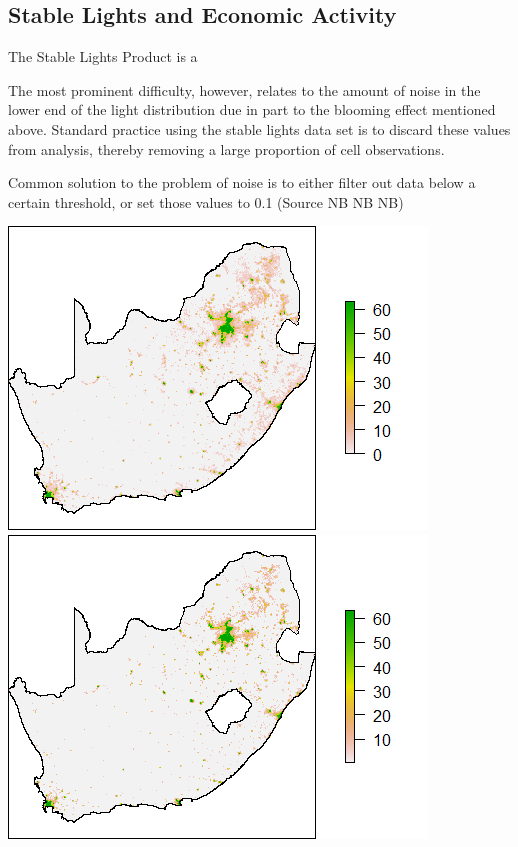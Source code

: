\documentclass[11pt,preprint, authoryear]{elsarticle}
\let\origfigure\figure
\let\endorigfigure\endfigure
\renewenvironment{figure}[1][2] {
    \expandafter\origfigure\expandafter[H]
} {
    \endorigfigure
}
\numberwithin{equation}{section}
\numberwithin{figure}{section}
\numberwithin{table}{section}
\begin{document}
\hypertarget{stable-lights-and-economic-activity}{%
\subsection{Stable Lights and Economic
Activity}\label{stable-lights-and-economic-activity}}

The Stable Lights Product is a

The most prominent difficulty, however, relates to the amount of noise
in the lower end of the light distribution due in part to the blooming
effect mentioned above. Standard practice using the stable lights data
set is to discard these values from analysis, thereby removing a large
proportion of cell observations.

Common solution to the problem of noise is to either filter out data
below a certain threshold, or set those values to 0.1 (Source NB NB NB)

\begin{figure}[H]
\includegraphics[width=0.5\linewidth]{figures/stable_SA} \includegraphics[width=0.5\linewidth]{figures/stable_SA_noise_filtered} \caption{\label{result_plot} Left - Raw Stable Lights; Right - Noise Discarded}\label{fig:stable_no_noise}
\end{figure}
\end{document}
